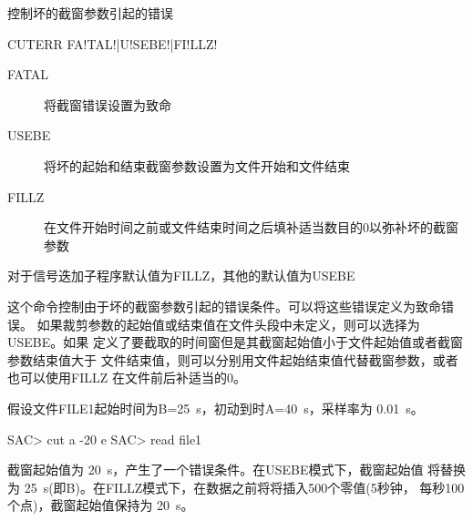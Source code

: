 \label{cmd:cuterr}

控制坏的截窗参数引起的错误

\begin{SACSTX}
CUTERR FA!TAL!|U!SEBE!|FI!LLZ!
\end{SACSTX}

\begin{description}
\item [FATAL] 将截窗错误设置为致命
\item [USEBE] 将坏的起始和结束截窗参数设置为文件开始和文件结束
\item [FILLZ] 在文件开始时间之前或文件结束时间之后填补适当数目的0以弥补坏的截窗参数
\end{description}

对于信号迭加子程序默认值为FILLZ，其他的默认值为USEBE

这个命令控制由于坏的截窗参数引起的错误条件。可以将这些错误定义为致命错误。
如果裁剪参数的起始值或结束值在文件头段中未定义，则可以选择为USEBE。如果
定义了要截取的时间窗但是其截窗起始值小于文件起始值或者截窗参数结束值大于
文件结束值，则可以分别用文件起始结束值代替截窗参数，或者也可以使用FILLZ
在文件前后补适当的0。

假设文件FILE1起始时间为B=\SI{25}{s}，初动到时A=\SI{40}{s}，采样率为 \SI{0.01}{s}。
\begin{SACCode}
SAC> cut a -20 e
SAC> read file1
\end{SACCode}
截窗起始值为 \SI{20}{s}，产生了一个错误条件。在USEBE模式下，截窗起始值
将替换为 \SI{25}{s}(即B)。在FILLZ模式下，在数据之前将将插入500个零值(5秒钟，
每秒100个点)，截窗起始值保持为 \SI{20}{s}。
